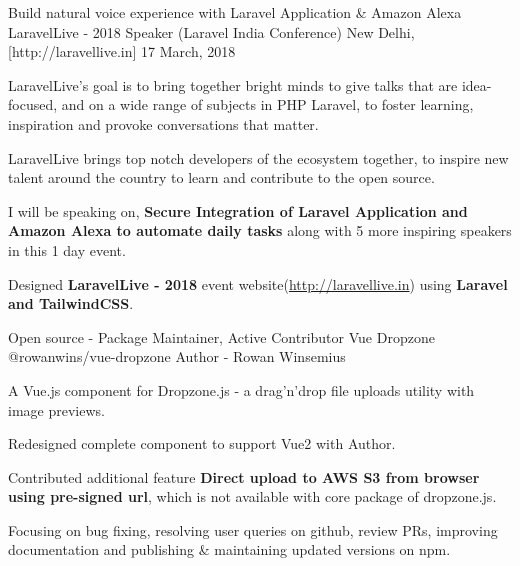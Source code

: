 

\begin{cventries}

  \cventry
    {Build natural voice experience with Laravel Application \& Amazon Alexa} %
    {LaravelLive - 2018 Speaker (Laravel India Conference)} %
    {New Delhi, [http://laravellive.in]} %
    {17 March, 2018} %
    {
      \begin{cvitems} %
        \item {LaravelLive's goal is to bring together bright minds to give talks that are idea-focused, and on a wide range of subjects in PHP Laravel, to foster learning, inspiration and provoke conversations that matter.}
        \item {LaravelLive brings top notch developers of the ecosystem together, to inspire new talent around the country to learn and contribute to the open source.}
        \item {I will be speaking on, \textbf{Secure Integration of Laravel Application and Amazon Alexa to automate daily tasks} along with 5 more inspiring speakers in this 1 day event.}
        \item {Designed \textbf{LaravelLive - 2018} event website(\href{http://laravellive.in}{http://laravellive.in}) using \textbf{Laravel and TailwindCSS}.}
      \end{cvitems}
    }
  \cventry
    {Open source - Package Maintainer, Active Contributor} %
    {Vue Dropzone} %
    {@rowanwins/vue-dropzone} %
    {Author - Rowan Winsemius} %
    {
      \begin{cvitems} %
        \item {A Vue.js component for Dropzone.js - a drag’n’drop file uploads utility with image previews.}
        \item {Redesigned complete component to support Vue2 with Author.}
        \item {Contributed additional feature \textbf{Direct upload to AWS S3 from browser using pre-signed url}, which is not available with core package of dropzone.js.}
        \item {Focusing on bug fixing, resolving user queries on github, review PRs, improving documentation and publishing \& maintaining updated versions on npm.}
      \end{cvitems}
    }


\end{cventries}
